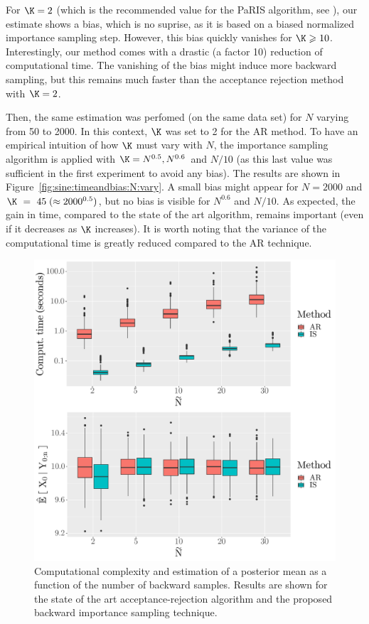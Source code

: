 \documentclass{article}
\newcommand{\N}{N}
\newcommand{\eqsp}{\;}
\begin{document}
For $\K = 2$ (which is the recommended value for the PaRIS algorithm, see \cite{olsson2017efficient}), our estimate shows a bias, which is no suprise, as it is based on a biased normalized importance sampling step. However, this bias quickly vanishes for $\K \geqslant 10$. 
Interestingly, our method comes with a drastic (a factor 10) reduction of computational time. 
The vanishing of the bias might induce more backward sampling, but this remains much faster than the acceptance rejection method with $\K = 2$.

Then, the same estimation was perfomed (on the same data set) for $\N$ varying from 50 to 2000.
In this context, $\K$ was set to 2 for the AR method. 
To have an empirical intuition of how $\K$ must vary with $\N$, the importance sampling algorithm is applied with $\K = \N^{0.5}, \N^{0.6}$ and $N / 10$ (as this last value was sufficient in the first experiment to avoid any bias). The results are shown in Figure~\ref{fig:sine:timeandbias:N:vary}. A  small bias might appear for $\N = 2000$ and $\K~=~45\eqsp(\approx 2000^{0.5})$, but no bias is visible for $\N^{0.6}$ and $\N /10$. 
As expected, the gain in time, compared to the state of the art algorithm, remains important (even if it decreases as $\K$ increases). 
It is worth noting that the variance of the computational time is greatly reduced compared to the AR technique.%

\begin{figure}[h]
\begin{center}
\includegraphics[scale = .4]{comparing_IS_AR_Ntilde_vary.pdf}
\end{center}
\caption{Computational complexity and estimation of a posterior mean as a function of the number of backward samples. Results are shown for the state of the art acceptance-rejection algorithm and the proposed backward importance sampling technique.}
\label{fig:sine:timeandbias}
\end{figure}
\end{document}
